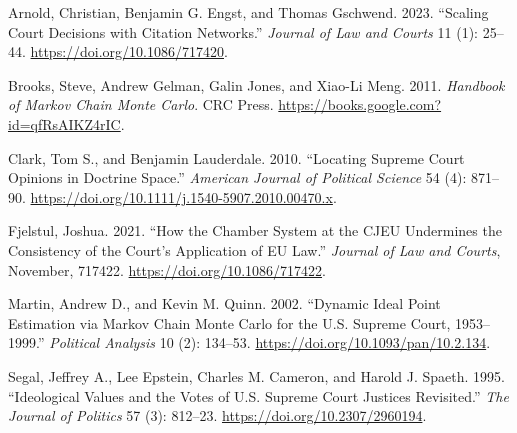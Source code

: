 \documentclass[
  11pt,
]{article}
\newlength{\cslhangindent}
\newenvironment{CSLReferences}[2] %
 {%
  \setlength{\parindent}{0pt}
  \ifodd #1 \everypar{\setlength{\hangindent}{\cslhangindent}}\ignorespaces\fi
  \ifnum #2 > 0
  \setlength{\parskip}{#2\baselineskip}
  \fi
 }%
 {}
\begin{document}
\hypertarget{refs}{}
\begin{CSLReferences}{1}{0}
\leavevmode{}%
Arnold, Christian, Benjamin G. Engst, and Thomas Gschwend. 2023.
{``Scaling {Court Decisions} with {Citation Networks}.''} \emph{Journal
of Law and Courts} 11 (1): 25--44. \url{https://doi.org/10.1086/717420}.

\leavevmode{}%
Brooks, Steve, Andrew Gelman, Galin Jones, and Xiao-Li Meng. 2011.
\emph{Handbook of {Markov Chain Monte Carlo}}. {CRC Press}.
\url{https://books.google.com?id=qfRsAIKZ4rIC}.

\leavevmode{}%
Clark, Tom S., and Benjamin Lauderdale. 2010. {``Locating {Supreme Court
Opinions} in {Doctrine Space}.''} \emph{American Journal of Political
Science} 54 (4): 871--90.
\url{https://doi.org/10.1111/j.1540-5907.2010.00470.x}.

\leavevmode{}%
Fjelstul, Joshua. 2021. {``How the {Chamber System} at the {CJEU
Undermines} the {Consistency} of the {Court}'s {Application} of {EU
Law}.''} \emph{Journal of Law and Courts}, November, 717422.
\url{https://doi.org/10.1086/717422}.

\leavevmode{}%
Martin, Andrew D., and Kevin M. Quinn. 2002. {``Dynamic {Ideal Point
Estimation} via {Markov Chain Monte Carlo} for the {U}.{S}. {Supreme
Court}, 1953--1999.''} \emph{Political Analysis} 10 (2): 134--53.
\url{https://doi.org/10.1093/pan/10.2.134}.

\leavevmode{}%
Segal, Jeffrey A., Lee Epstein, Charles M. Cameron, and Harold J.
Spaeth. 1995. {``Ideological {Values} and the {Votes} of {U}.{S}.
{Supreme Court Justices Revisited}.''} \emph{The Journal of Politics} 57
(3): 812--23. \url{https://doi.org/10.2307/2960194}.

\end{CSLReferences}
\end{document}
